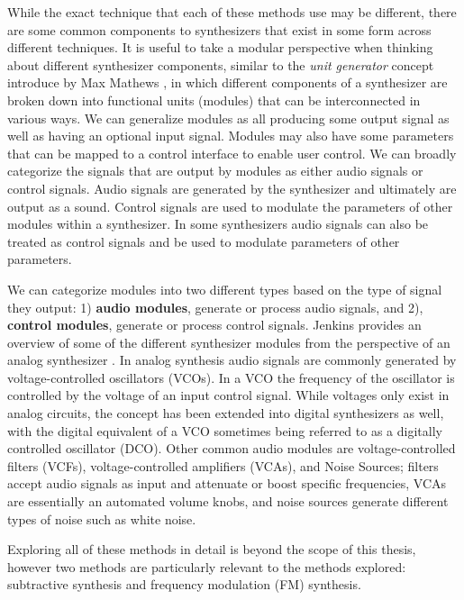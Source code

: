 While the exact technique that each of these methods use may be different, there are some common components to synthesizers that exist in some form across different techniques. It is useful to take a modular perspective when thinking about different synthesizer components, similar to the \textit{unit generator} concept introduce by Max Mathews \cite{roads1980interview}, in which different components of a synthesizer are broken down into functional units (modules) that can be interconnected in various ways. We can generalize modules as all producing some output signal as well as having an optional input signal. Modules may also have some parameters that can be mapped to a control interface to enable user control. We can broadly categorize the signals that are output by modules as either audio signals or control signals. Audio signals are generated by the synthesizer and ultimately are output as a sound. Control signals are used to modulate the parameters of other modules within a synthesizer. In some synthesizers audio signals can also be treated as control signals and be used to modulate parameters of other parameters.

We can categorize modules into two different types based on the type of signal they output: 1) \textbf{audio modules}, generate or process audio signals, and 2), \textbf{control modules}, generate or process control signals. Jenkins provides an overview of some of the different synthesizer modules from the perspective of an analog synthesizer \cite{jenkins2019analog}. In analog synthesis audio signals are commonly generated by voltage-controlled oscillators (VCOs). In a VCO the frequency of the oscillator is controlled by the voltage of an input control signal. While voltages only exist in analog circuits, the concept has been extended into digital synthesizers as well, with the digital equivalent of a VCO sometimes being referred to as a digitally controlled oscillator (DCO). Other common audio modules are voltage-controlled filters (VCFs), voltage-controlled amplifiers (VCAs), and Noise Sources; filters accept audio signals as input and attenuate or boost specific frequencies, VCAs are essentially an automated volume knobs, and noise sources generate different types of noise such as white noise.

Exploring all of these methods in detail is beyond the scope of this thesis, however two methods are particularly relevant to the methods explored: subtractive synthesis and frequency modulation (FM) synthesis. 


